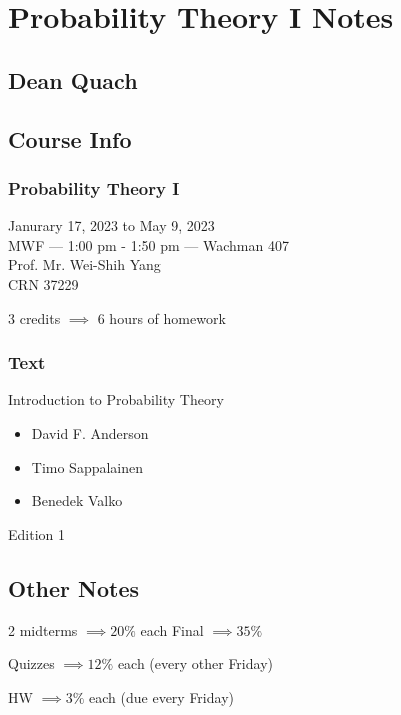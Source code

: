 \documentclass[12pt]{book}
\begin{document}
\frontmatter
%
\chapter*{\Huge \center Probability Theory I Notes}
\thispagestyle{empty}
\section*{\huge \center Dean Quach}



\newpage
\section*{\center \normalsize Course Info}
\subsection*{\center \normalsize Probability Theory I}

\begin{center}
Janurary 17, 2023 to May 9, 2023\\
MWF --- 1:00 pm - 1:50 pm --- Wachman 407\\
Prof. Mr. Wei-Shih Yang\\
CRN 37229

3 credits $\implies{}$ 6 hours of homework
\end{center}

\subsection*{\center \normalsize Text}
\begin{center}
Introduction to Probability Theory
\begin{itemize}
\item David F. Anderson
\item Timo Sappalainen
\item Benedek Valko
\end{itemize}
Edition 1
\end{center}


\newpage
\section*{\center \normalsize Other Notes}
\begin{center}
2 midterms $\implies 20\%$ each
Final $\implies 35\%$

Quizzes $\implies 12\%$ each
(every other Friday)

HW $\implies 3\%$ each
(due every Friday)
\end{center}
\end{document}
